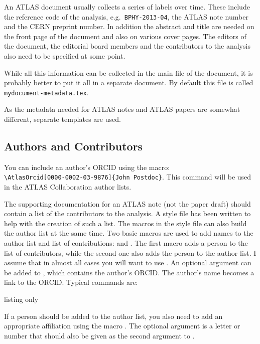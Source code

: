 An ATLAS document usually collects a series of labels over time.
These include the reference code of the analysis, e.g.\ \texttt{BPHY-2013-04}, 
the ATLAS note number and the CERN preprint number.
In addition the abstract and title are needed on the front page of the document and also on various cover pages.
The editors of the document, the editorial board members and the contributors to the analysis
also need to be specified at some point.

While all this information can be collected in the main file of the document, 
it is probably better to put it all in a separate document.
By default this file is called \texttt{mydocument-metadata.tex}.

 As the metadata needed for ATLAS notes and ATLAS papers are somewhat different,
separate templates are used.


\subsection{Authors and Contributors}
\label{sec:contribute}

You can include an author's ORCID using the  macro:\\
\verb+\AtlasOrcid[0000-0002-03-9876]{John Postdoc}+.
This command will be used in the ATLAS Collaboration author lists.

The supporting documentation for an ATLAS note (not the paper draft) should contain a list of the contributors to the analysis.
A style file  has been written to help with the creation of such a list.
The macros in the style file can also build the author list at the same time.
Two basic macros are used to add names to the author list and list of contributions:
 and . 
The first macro adds a person to the list of contributors, while the second one also adds the person
to the author list. I assume that in almost all cases you will want to use .
An optional argument can be added to , which contains the author's ORCID.
The author's name becomes a link to the ORCID.
Typical commands are:
\begin{tcblisting}{listing only}
\end{tcblisting}
If a person should be added to the author list, you also need to add an appropriate affiliation using the macro .
The optional argument is a letter or number that should also be given as the second argument to
.

